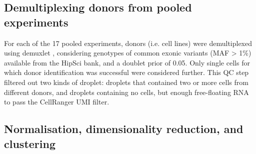 
\newpage

\subsection{Demultiplexing donors from pooled experiments}

For each of the 17 pooled experiments, donors (i.e. cell lines) were demultiplexed using demuxlet \cite{kang2018multiplexed}, considering genotypes of common exonic variants (MAF > 1\%) available from the HipSci bank, and a doublet prior of 0.05. 
Only single cells for which donor identification was successful were considered further. 
This QC step filtered out two kinds of droplet: droplets that contained two or more cells from different donors, and droplets containing no cells, but 
enough
free-floating RNA 
to pass
the CellRanger UMI filter.

\subsection{Normalisation, dimensionality reduction, and clustering}


